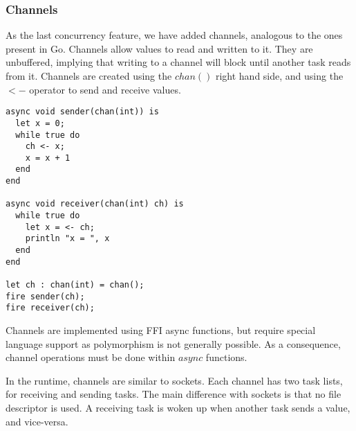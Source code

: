 \documentclass{article}
\begin{document}
\subsubsection{Channels}
As the last concurrency feature, we have added channels, analogous to the ones present in Go.
Channels allow values to read and written to it. They are unbuffered, implying that writing to a channel will block
until another task reads from it. Channels are created using the $chan()$ right hand side, and using the $<-$ operator
to send and receive values.

\begin{lstlisting}
async void sender(chan(int)) is
  let x = 0;
  while true do
    ch <- x;
    x = x + 1
  end
end

async void receiver(chan(int) ch) is
  while true do
    let x = <- ch;
    println "x = ", x
  end
end

let ch : chan(int) = chan();
fire sender(ch);
fire receiver(ch);
\end{lstlisting}

Channels are implemented using FFI async functions, but require special language support as polymorphism is not generally
possible. As a consequence, channel operations must be done within $async$ functions.

In the runtime, channels are similar to sockets. Each channel has two task lists, for receiving and sending tasks.
The main difference with sockets is that no file descriptor is used. A receiving task is woken up when another task sends
a value, and vice-versa.
\end{document}
